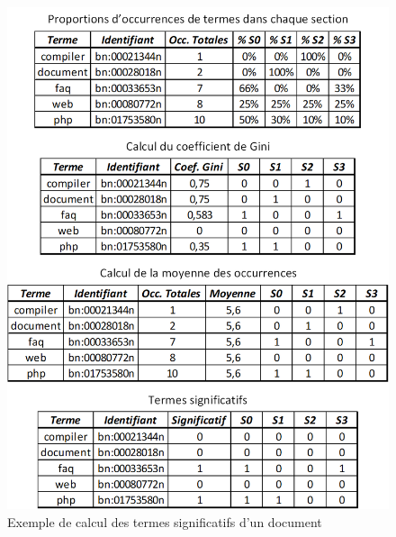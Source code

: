 \begin{figure}[ht]
\centering
\centerline{  %
\includegraphics[scale=1]{5-Conclusion/images/3-analyse-temporelle/exemple_termes_significatifs.png}
}
\caption{Exemple de calcul des termes significatifs d'un document}
\label{figure:5-III-2-ExempleTermesSignificatifs}
\end{figure}

\vfill
\hspace{0pt}

\newpage

\hspace{0pt}
\vfill

